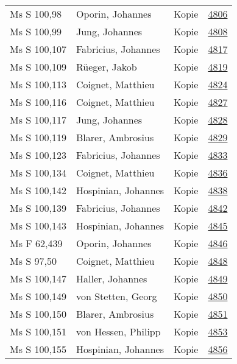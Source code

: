 \documentclass[10pt,a4paper,landscape]{report}
\begin{document}
\begin{longtable}{p{16cm}p{4cm}lr}
Ms S 100,98	&	Oporin, Johannes	&	Kopie	&	\href{http://130.60.24.72/assignment/4806}{4806}\\
Ms S 100,99	&	Jung, Johannes	&	Kopie	&	\href{http://130.60.24.72/assignment/4808}{4808}\\
Ms S 100,107	&	Fabricius, Johannes	&	Kopie	&	\href{http://130.60.24.72/assignment/4817}{4817}\\
Ms S 100,109	&	Rüeger, Jakob	&	Kopie	&	\href{http://130.60.24.72/assignment/4819}{4819}\\
Ms S 100,113	&	Coignet, Matthieu	&	Kopie	&	\href{http://130.60.24.72/assignment/4824}{4824}\\
Ms S 100,116	&	Coignet, Matthieu	&	Kopie	&	\href{http://130.60.24.72/assignment/4827}{4827}\\
Ms S 100,117	&	Jung, Johannes	&	Kopie	&	\href{http://130.60.24.72/assignment/4828}{4828}\\
Ms S 100,119	&	Blarer, Ambrosius	&	Kopie	&	\href{http://130.60.24.72/assignment/4829}{4829}\\
Ms S 100,123	&	Fabricius, Johannes	&	Kopie	&	\href{http://130.60.24.72/assignment/4833}{4833}\\
Ms S 100,134	&	Coignet, Matthieu	&	Kopie	&	\href{http://130.60.24.72/assignment/4836}{4836}\\
Ms S 100,142	&	Hospinian, Johannes	&	Kopie	&	\href{http://130.60.24.72/assignment/4838}{4838}\\
Ms S 100,139	&	Fabricius, Johannes	&	Kopie	&	\href{http://130.60.24.72/assignment/4842}{4842}\\
Ms S 100,143	&	Hospinian, Johannes	&	Kopie	&	\href{http://130.60.24.72/assignment/4845}{4845}\\
Ms F 62,439	&	Oporin, Johannes	&	Kopie	&	\href{http://130.60.24.72/assignment/4846}{4846}\\
Ms S 97,50	&	Coignet, Matthieu	&	Kopie	&	\href{http://130.60.24.72/assignment/4848}{4848}\\
Ms S 100,147	&	Haller, Johannes	&	Kopie	&	\href{http://130.60.24.72/assignment/4849}{4849}\\
Ms S 100,149	&	von Stetten, Georg	&	Kopie	&	\href{http://130.60.24.72/assignment/4850}{4850}\\
Ms S 100,150	&	Blarer, Ambrosius	&	Kopie	&	\href{http://130.60.24.72/assignment/4851}{4851}\\
Ms S 100,151	&	von Hessen, Philipp	&	Kopie	&	\href{http://130.60.24.72/assignment/4853}{4853}\\
Ms S 100,155	&	Hospinian, Johannes	&	Kopie	&	\href{http://130.60.24.72/assignment/4856}{4856}\\

\end{longtable}
\end{document}
